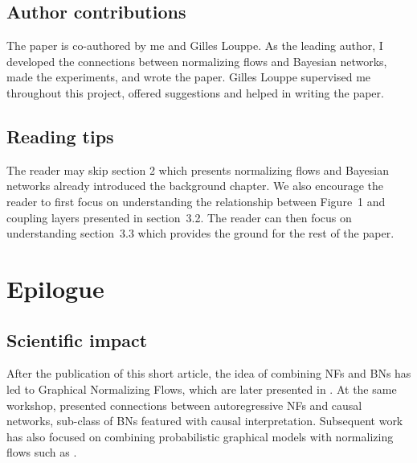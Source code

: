 \subsection{Author contributions}
The paper is co-authored by me and Gilles Louppe. As the leading author, I developed the connections between normalizing flows and Bayesian networks, made the experiments, and wrote the paper. Gilles Louppe supervised me throughout this project, offered suggestions and helped in writing the paper.

\subsection{Reading tips}
The reader may skip section 2 which presents normalizing flows and Bayesian networks already introduced the background chapter. We also encourage the reader to first focus on understanding the relationship between Figure~1 and coupling layers presented in section~3.2. The reader can then focus on understanding section~3.3 which provides the ground for the rest of the paper.


\section{Epilogue}
\subsection{Scientific impact}
After the publication of this short article, the idea of combining NFs and BNs has led to Graphical Normalizing Flows, which are later presented in . At the same workshop, \citet{khemakhem_causal_2020} presented connections between autoregressive NFs and causal networks, sub-class of BNs featured with causal interpretation. Subsequent work has also focused on combining probabilistic graphical models with normalizing flows such as \citet{mouton2022graphical, mouton2022siren}.

